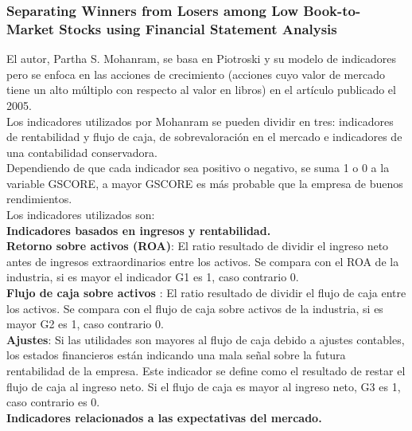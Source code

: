 \subsubsection{Separating Winners from Losers among Low Book-to-Market Stocks using Financial Statement Analysis}

El autor, Partha S. Mohanram, se basa en Piotroski y su modelo de indicadores pero se enfoca en las acciones de crecimiento (acciones cuyo valor de mercado tiene un alto múltiplo con respecto al valor en libros) en el artículo \cite{Mohanram2005} publicado el 2005. \\

Los indicadores utilizados por Mohanram se pueden dividir en tres: indicadores de rentabilidad y flujo de caja, de sobrevaloración en el mercado e indicadores de una contabilidad conservadora.\\

Dependiendo de que cada indicador sea positivo o negativo, se suma 1 o 0 a la variable GSCORE, a mayor GSCORE es más probable que la empresa de buenos rendimientos.\\

Los indicadores utilizados son:\\

\textbf{Indicadores basados en ingresos y rentabilidad.}\\

\textbf{Retorno sobre activos (ROA)}: El ratio resultado de dividir el ingreso neto antes de ingresos extraordinarios entre los activos. Se compara con el ROA de la industria, si es mayor el indicador G1 es 1, caso contrario 0.\\

\textbf{Flujo de caja sobre activos }: El ratio resultado de dividir el flujo de caja entre los activos. Se compara con el flujo de caja sobre activos de la industria, si es mayor G2 es 1, caso contrario 0.\\

\textbf{Ajustes}: Si las utilidades son mayores al flujo de caja debido a ajustes contables, los estados financieros están indicando una mala señal sobre la futura rentabilidad de la empresa. Este indicador se define como el resultado de restar el flujo de caja al ingreso neto. Si el flujo de caja es mayor al ingreso neto, G3 es 1, caso contrario es 0.\\

\textbf{Indicadores relacionados a las expectativas del mercado.}\\

